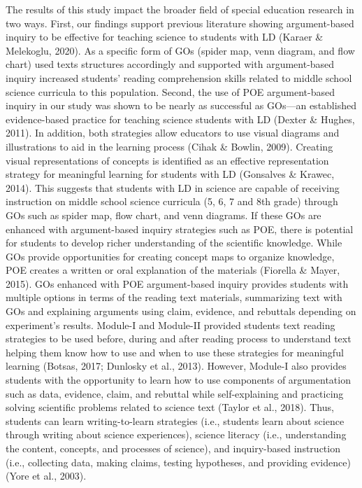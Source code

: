 \documentclass[11.5pt]{sig-alternate} %
\begin{document}
\begin{large}
The results of this study impact the broader field of special education research in two ways. First, our findings support previous literature showing argument-based inquiry to be effective for teaching science to students with LD (Karaer \& Melekoglu, 2020). As a specific form of GOs (spider map, venn diagram, and flow chart) used texts structures accordingly and supported with argument-based inquiry increased students’ reading comprehension skills related to middle school science curricula to this population. Second, the use of POE argument-based inquiry in our study was shown to be nearly as successful as GOs—an established evidence-based practice for teaching science students with LD (Dexter \& Hughes, 2011). In addition, both strategies allow educators to use visual diagrams and illustrations to aid in the learning process (Cihak \& Bowlin, 2009). Creating visual representations of concepts is identified as an effective representation strategy for meaningful learning for students with LD (Gonsalves \& Krawec, 2014). This suggests that students with LD in science are capable of receiving instruction on middle school science curricula (5, 6, 7 and 8th grade) through GOs such as spider map, flow chart, and venn diagrams. If these GOs are enhanced with argument-based inquiry strategies such as POE, there is potential for students to develop richer understanding of the scientific knowledge. While GOs provide opportunities for creating concept maps to organize knowledge, POE creates a written or oral explanation of the materials (Fiorella \& Mayer, 2015). GOs enhanced with POE argument-based inquiry provides students with multiple options in terms of the reading text materials, summarizing text with GOs and explaining arguments using claim, evidence, and rebuttals depending on experiment’s results. Module-I and Module-II provided students text reading strategies to be used before, during and after reading process to understand text helping them know how to use and when to use these strategies for meaningful learning (Botsas, 2017; Dunlosky et al., 2013). However, Module-I also provides students with the opportunity to learn how to use components of argumentation such as data, evidence, claim, and rebuttal while self-explaining and practicing solving scientific problems related to science text (Taylor et al., 2018). Thus, students can learn writing-to-learn strategies (i.e., students learn about science through writing about science experiences), science literacy (i.e., understanding the content, concepts, and processes of science), and inquiry-based instruction (i.e., collecting data, making claims, testing hypotheses, and providing evidence) (Yore et al., 2003). 


\end{large}
\end{document}
